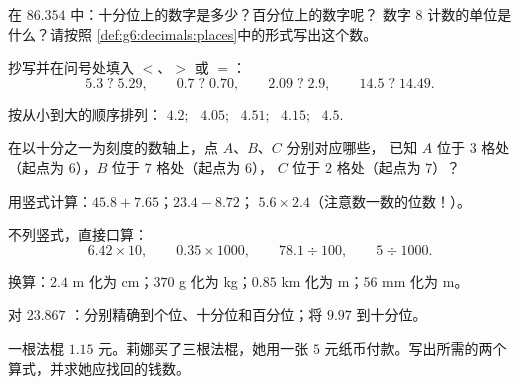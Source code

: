 \begin{exercise}[$\star$]\label{exo:g6:decimals:2}
在 $86.354$ 中：十分位上的数字是多少？百分位上的数字呢？
数字 $8$ 计数的单位是什么？请按照
\cref{def:g6:decimals:places}中的形式写出这个数。
\end{exercise}

\begin{exercise}[$\star$]\label{exo:g6:decimals:3}
抄写并在问号处填入 $<$、$>$ 或 $=$：
\[
5.3 \;?\; 5.29, \qquad
0.7 \;?\; 0.70, \qquad
2.09 \;?\; 2.9, \qquad
14.5 \;?\; 14.49 .
\]
\end{exercise}

\begin{exercise}[$\star$]\label{exo:g6:decimals:4}
按从小到大的顺序排列：
$4.2$; \ $4.05$; \ $4.51$; \ $4.15$; \ $4.5$.
\end{exercise}

\begin{exercise}[$\star$]\label{exo:g6:decimals:5}
在以十分之一为刻度的数轴上，点 $A$、$B$、$C$ 分别对应哪些，
已知 $A$ 位于 $3$ 格处（起点为 $6$），$B$ 位于 $7$ 格处（起点为 $6$），
$C$ 位于 $2$ 格处（起点为 $7$）？
\end{exercise}

\begin{exercise}[$\star$]\label{exo:g6:decimals:6}
用竖式计算：$45.8 + 7.65$；\quad $23.4 - 8.72$；\quad
$5.6 \times 2.4$（注意数一数的位数！）。
\end{exercise}

\begin{exercise}[$\star$]\label{exo:g6:decimals:7}
不列竖式，直接口算：
\[
6.42 \times 10, \qquad
0.35 \times 1000, \qquad
78.1 \div 100, \qquad
5 \div 1000 .
\]
\end{exercise}

\begin{exercise}[$\star$]\label{exo:g6:decimals:8}
换算：$2.4$ m 化为 cm；\quad $370$ g 化为 kg；\quad $0.85$ km 化为
m；\quad $56$ mm 化为 m。
\end{exercise}

\begin{exercise}[$\star$]\label{exo:g6:decimals:9}
对 $23.867$ ：分别精确到个位、十分位和百分位；将
$9.97$ 到十分位。
\end{exercise}

\begin{exercise}[$\star\star$]\label{exo:g6:decimals:10}
一根法棍 $1.15$ 元。莉娜买了三根法棍，她用一张
$5$ 元纸币付款。写出所需的两个算式，并求她应找回的钱数。
\end{exercise}

